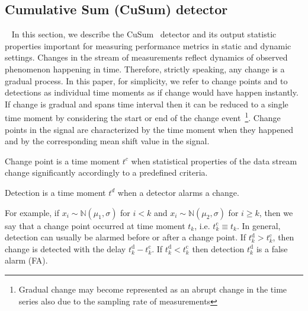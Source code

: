 \subsection{Cumulative Sum (CuSum) detector}~\label{subsec:cusum_detector}
In this section, we describe the CuSum~\cite{Page1954} detector and its output statistic properties important for measuring performance metrics in static and dynamic settings.
Changes in the stream of measurements reflect dynamics of observed phenomenon happening in time.
Therefore, strictly speaking, any change is a gradual process.
In this paper, for simplicity, we refer to change points and to detections as individual time moments as if change would have happen instantly. If change is gradual and spans time interval then it can be reduced to a single time moment by considering the start or end of the change event~\footnote{Gradual change may become represented as an abrupt change in the time series also due to the sampling rate of measurements}. 
Change points in the signal are characterized by the time moment when they happened and by the corresponding mean shift value in the signal.
\begin{definition}
  Change point is a time moment $t^c$ when statistical properties of the data stream change significantly accordingly to a predefined criteria.
\end{definition}
\begin{definition}
  Detection is a time moment $t^d$ when a detector alarms a change.
\end{definition}
For example, if $x_i \sim \mathbb{N}(\mu_1, \sigma)$ for $i < k$ and $x_i \sim \mathbb{N}(\mu_2, \sigma)$ for $i \geq k$,
then we say that a change point occurred at time moment $t_k$, i.e. $t^{\text{c}}_{k} \equiv t_k$.
In general, detection can usually be alarmed before or after a change point.
If $t^{\text{d}}_k > t^{\text{c}}_k$, then change is detected with the delay $t^{\text{d}}_k - t^{\text{c}}_k$.
If $t^{\text{d}}_k < t^{\text{c}}_k$ then detection $t^{\text{d}}_k$ is a false alarm (FA).

